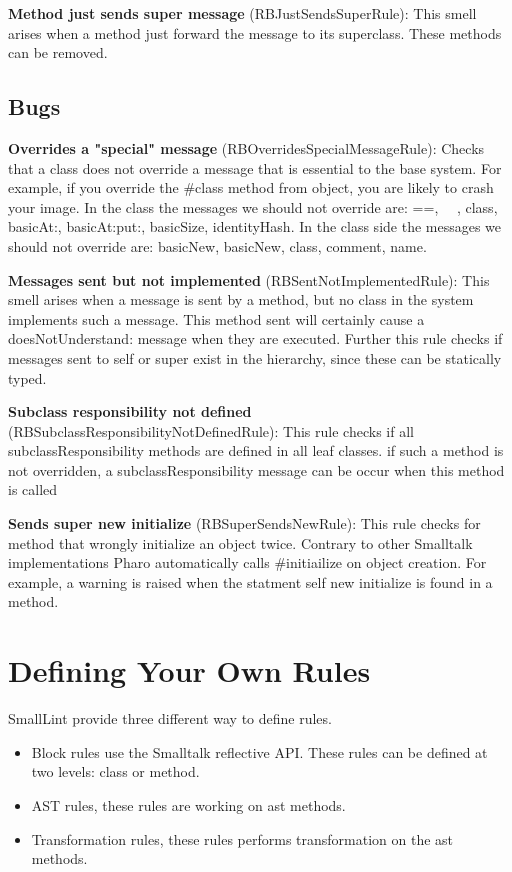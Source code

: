 \documentclass[a4paper,10pt,twoside]{book}
\begin{document}
\textbf{Method just sends super message} (RBJustSendsSuperRule): This smell arises when a method just forward the message to its superclass. These methods can be removed.

\subsection{Bugs}
\textbf{Overrides a "special" message} (RBOverridesSpecialMessageRule): Checks that a class does not override a message that is essential to the base system. For example, if you override the \#class method from object, you are likely to crash your image.
In the class the messages we should not override are: ==, ~~, class, basicAt:, basicAt:put:, basicSize, identityHash.
In the class side the messages we should not override are: basicNew, basicNew, class, comment, name.

\textbf{Messages sent but not implemented} (RBSentNotImplementedRule): This smell arises when a message is sent by a method,  but no class in the system implements such a message. This method sent will certainly cause a doesNotUnderstand: message when they are executed.  Further this rule checks if messages sent to self or super exist in the hierarchy, since these can be statically typed.

\textbf{Subclass responsibility not defined} (RBSubclassResponsibilityNotDefinedRule): This rule checks if all subclassResponsibility methods are defined in all leaf classes. if such a method is not overridden, a subclassResponsibility message can be occur when this method is called

\textbf{Sends super new initialize} (RBSuperSendsNewRule):  This rule checks for method that wrongly initialize an object twice. Contrary to other Smalltalk implementations Pharo automatically calls \#initiailize on object creation.
For example, a warning is raised when the statment self new initialize is found in a method.




\section{Defining Your Own Rules}
SmallLint provide three different way to define rules.
\begin{itemize}
	\item Block rules use the Smalltalk reflective API. These rules can be defined at two levels: class or method.
	\item AST rules, these rules are working on ast methods. 
	\item Transformation rules, these rules performs transformation on the ast methods.
\end{itemize}
\end{document}
